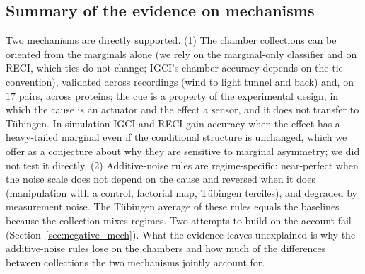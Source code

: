 \subsection{Summary of the evidence on mechanisms}
Two mechanisms are directly supported. (1) The chamber collections can be oriented from the marginals alone (we rely on the marginal-only classifier and on RECI, which ties do not change; IGCI's chamber accuracy depends on the tie convention), validated across recordings (wind to light tunnel and back) and, on $17$ pairs, across proteins; the cue is a property of the experimental design, in which the cause is an actuator and the effect a sensor, and it does not transfer to T\"ubingen. In simulation IGCI and RECI gain accuracy when the effect has a heavy-tailed marginal even if the conditional structure is unchanged, which we offer as a conjecture about why they are sensitive to marginal asymmetry; we did not test it directly. (2) Additive-noise rules are regime-specific: near-perfect when the noise scale does not depend on the cause and reversed when it does (manipulation with a control, factorial map, T\"ubingen terciles), and degraded by measurement noise. The T\"ubingen average of these rules equals the baselines because the collection mixes regimes. Two attempts to build on the account fail (Section~\ref{sec:negative_mech}). What the evidence leaves unexplained is why the additive-noise rules lose on the chambers and how much of the differences between collections the two mechanisms jointly account for.
